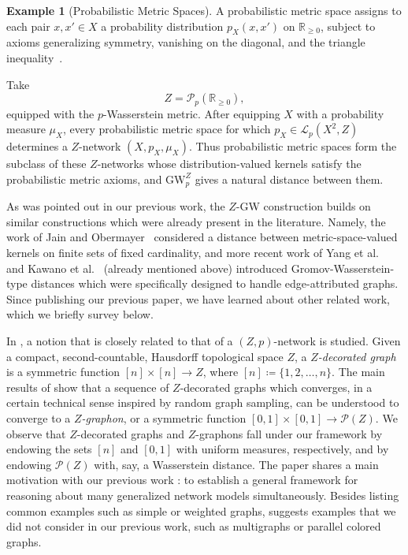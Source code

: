 \documentclass{article}
\theoremstyle{definition}
\newtheorem{example}[proposition]{Example}
\newcommand{\dgwz}{\mathrm{GW}_p^Z}
\begin{document}
%
%
%
%
%
%
%
%
%
%
%
%
%
%
%
%
%

%

\begin{example}[Probabilistic Metric Spaces]
A probabilistic metric space assigns to each pair \(x,x'\in X\) a
probability distribution \(p_X(x,x')\) on \(\mathbb R_{\geq0}\), subject
to axioms generalizing symmetry, vanishing on the diagonal, and the
triangle inequality~\cite{menger1942statistical,schweizer1960statistical,
kramosil1975fuzzy,wald1943statistical}.

Take
\[
    Z=\mathcal P_p(\mathbb R_{\geq0}),
\]
equipped with the \(p\)-Wasserstein metric. After equipping \(X\) with a
probability measure \(\mu_X\), every probabilistic metric space for which
\(p_X\in\mathcal L_p(X^2,Z)\) determines a \(Z\)-network
\((X,p_X,\mu_X)\). Thus probabilistic metric spaces form the subclass of
these \(Z\)-networks whose distribution-valued kernels satisfy the
probabilistic metric axioms, and \(\dgwz\) gives a natural distance
between them.
\end{example}

%
%
%
%
%
%
%
%
%
%
%

%
%
%
%
%
%
%
%
%
%
%

As was pointed out in our previous work, the $Z$-GW construction builds on similar constructions which were already present in the literature. Namely, the work of Jain and Obermayer~\cite{jain2009structure} considered a distance between metric-space-valued kernels on finite sets of fixed cardinality, and more recent work of Yang et al.~\cite{yang2024exploiting} and Kawano et al.~\cite{kawano2024multi} (already mentioned above) introduced Gromov-Wasserstein-type distances which were specifically designed to handle edge-attributed graphs. Since publishing our previous paper, we have learned about other related work, which we briefly survey below.

In \cite{lovasz2010limits}, a notion that is closely related to that of a $(Z,p)$-network is studied. Given a compact, second-countable, Hausdorff topological space $Z$, a \emph{$Z$-decorated graph} is a symmetric function $[n] \times [n] \to Z$, where $[n]\coloneqq \{1,2,\ldots,n\}$. The main results of \cite{lovasz2010limits} show that a sequence of $Z$-decorated graphs which converges, in a certain technical sense inspired by random graph sampling, can be understood to converge to a \emph{$Z$-graphon}, or a symmetric function $[0,1]\times[0,1] \to \mathcal{P}(Z)$. We observe that $Z$-decorated graphs and $Z$-graphons fall under our framework by endowing the sets $[n]$ and $[0,1]$ with uniform measures, respectively, and by endowing $\mathcal{P}(Z)$ with, say, a Wasserstein distance. The paper \cite{lovasz2010limits} shares a main motivation with our previous work \cite{bauer2025zgromovwassersteindistance}: to establish a general framework for reasoning about many generalized network models simultaneously. Besides listing common examples such as simple or weighted  graphs, \cite{lovasz2010limits} suggests examples that we did not consider in our previous work, such as multigraphs or parallel colored graphs. 
\end{document}
